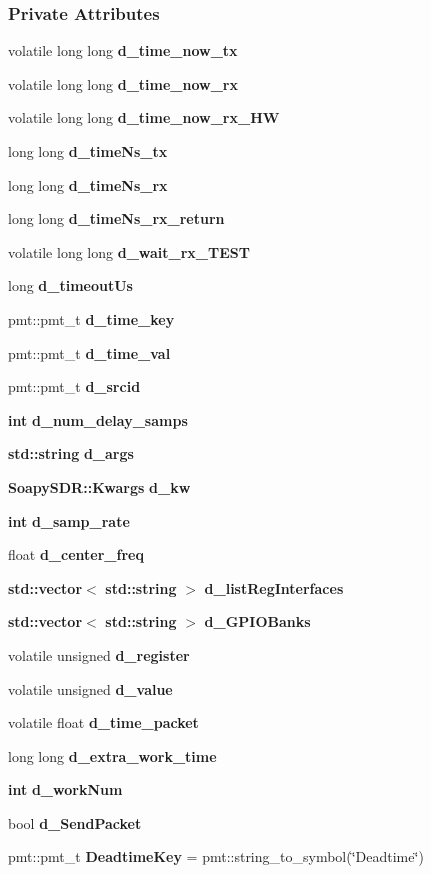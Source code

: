 \subsubsection*{Private Attributes}
\begin{DoxyCompactItemize}
\item 
volatile long long {\bf d\+\_\+time\+\_\+now\+\_\+tx}
\item 
volatile long long {\bf d\+\_\+time\+\_\+now\+\_\+rx}
\item 
volatile long long {\bf d\+\_\+time\+\_\+now\+\_\+rx\+\_\+\+HW}
\item 
long long {\bf d\+\_\+time\+Ns\+\_\+tx}
\item 
long long {\bf d\+\_\+time\+Ns\+\_\+rx}
\item 
long long {\bf d\+\_\+time\+Ns\+\_\+rx\+\_\+return}
\item 
volatile long long {\bf d\+\_\+wait\+\_\+rx\+\_\+\+T\+E\+ST}
\item 
long {\bf d\+\_\+timeout\+Us}
\item 
pmt\+::pmt\+\_\+t {\bf d\+\_\+time\+\_\+key}
\item 
pmt\+::pmt\+\_\+t {\bf d\+\_\+time\+\_\+val}
\item 
pmt\+::pmt\+\_\+t {\bf d\+\_\+srcid}
\item 
{\bf int} {\bf d\+\_\+num\+\_\+delay\+\_\+samps}
\item 
{\bf std\+::string} {\bf d\+\_\+args}
\item 
{\bf Soapy\+S\+D\+R\+::\+Kwargs} {\bf d\+\_\+kw}
\item 
{\bf int} {\bf d\+\_\+samp\+\_\+rate}
\item 
float {\bf d\+\_\+center\+\_\+freq}
\item 
{\bf std\+::vector}$<$ {\bf std\+::string} $>$ {\bf d\+\_\+list\+Reg\+Interfaces}
\item 
{\bf std\+::vector}$<$ {\bf std\+::string} $>$ {\bf d\+\_\+\+G\+P\+I\+O\+Banks}
\item 
volatile unsigned {\bf d\+\_\+register}
\item 
volatile unsigned {\bf d\+\_\+value}
\item 
volatile float {\bf d\+\_\+time\+\_\+packet}
\item 
long long {\bf d\+\_\+extra\+\_\+work\+\_\+time}
\item 
{\bf int} {\bf d\+\_\+work\+Num}
\item 
bool {\bf d\+\_\+\+Send\+Packet}
\item 
pmt\+::pmt\+\_\+t {\bf Deadtime\+Key} = pmt\+::string\+\_\+to\+\_\+symbol(\char`\"{}Deadtime\char`\"{})

\end{DoxyCompactItemize}
